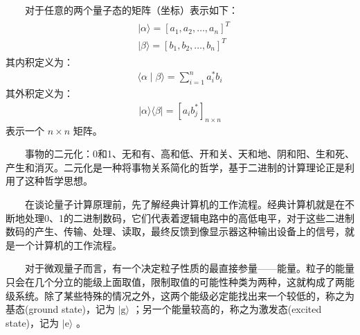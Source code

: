 \documentclass[a4paper,11pt,english]{sphinxmanual}
\begin{document}
\sphinxAtStartPar
  对于任意的两个量子态的矩阵（坐标）表示如下：
\begin{equation*}
\begin{split}\begin{aligned} &|\alpha\rangle=\left[a_{1}, a_{2}, \ldots, a_{n}\right]^{T} \\ &|\beta\rangle=\left[b_{1}, b_{2}, \ldots, b_{n}\right]^{T} \end{aligned}\end{split}
\end{equation*}
\sphinxAtStartPar
其内积定义为：
\begin{equation*}
\begin{split}\langle\alpha \mid \beta\rangle=\sum_{i=1}^{n} a_{i}^{*} b_{i}\end{split}
\end{equation*}
\sphinxAtStartPar
其外积定义为：
\begin{equation*}
\begin{split}|\alpha\rangle\langle\beta|=\left[a_{i} b^{*}_{j} \right]_{n \times n}\end{split}
\end{equation*}
\sphinxAtStartPar
表示一个 \(n \times n\) 矩阵。

\sphinxAtStartPar
{}

\sphinxAtStartPar
  事物的二元化：0和1、无和有、高和低、开和关、天和地、阴和阳、生和死、产生和消灭。二元化是一种将事物关系简化的哲学，基于二进制的计算理论正是利用了这种哲学思想。

\sphinxAtStartPar
  在谈论量子计算原理前，先了解经典计算机的工作流程。经典计算机就是在不断地处理0、1的二进制数码，它们代表着逻辑电路中的高低电平，对于这些二进制数码的产生、传输、处理、读取，最终反馈到像显示器这种输出设备上的信号，就是一个计算机的工作流程。

\sphinxAtStartPar
  对于微观量子而言，有一个决定粒子性质的最直接参量——能量。粒子的能量只会在几个分立的能级上面取值，限制取值的可能性种类为两种，这就构成了两能级系统。除了某些特殊的情况之外，这两个能级必定能找出来一个较低的，称之为基态(ground state)，记为 \(|\mathrm{g}\rangle\) ；另一个能量较高的，称之为激发态(excited state)，记为  \(|\mathrm{e}\rangle\) 。
\end{document}
